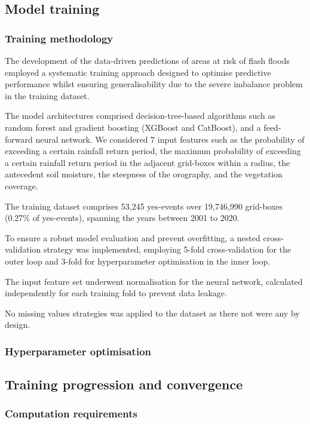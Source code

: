 \subsection{Model training}

\subsubsection{Training methodology}

The development of the data-driven predictions of areas at risk of flash floods employed a systematic training approach designed to optimise predictive performance whilst ensuring generalisability due to the severe imbalance problem in the training dataset. 

The model architectures comprised decision-tree-based algorithms such as random forest and gradient boosting (XGBoost and CatBoost), and a feed-forward neural network. We considered 7 input features such as the probability of exceeding a certain rainfall return period, the maximum probability of exceeding a certain rainfall return period in the adjacent grid-boxes within a radius, the antecedent soil moisture, the steepness of the orography, and the vegetation coverage. 

The training dataset comprises 53,245 yes-events over 19,746,990 grid-boxes (0.27\% of yes-events), spanning the years between 2001 to 2020. 

To ensure a robust model evaluation and prevent overfitting, a nested cross-validation strategy was implemented, employing 5-fold cross-validation for the outer loop and 3-fold for hyperparameter optimisation in the inner loop. 

The input feature set underwent normalisation for the neural network, calculated independently for each training fold to prevent data leakage.

No missing values strategies was applied to the dataset as there not were any by design.


\subsubsection{Hyperparameter optimisation}



\subsection{Training progression and convergence}


\subsubsection{Computation requirements}



